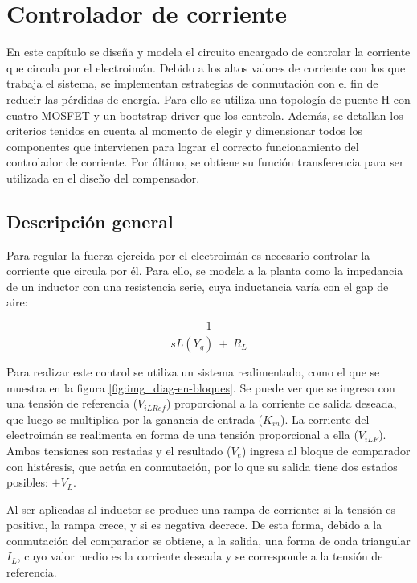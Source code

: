 \chapter{Controlador de corriente}  \label{cap:ControladorCorriente}

En este capítulo se diseña y modela el circuito encargado de controlar la corriente que circula por el electroimán. Debido a los altos valores de corriente con los que trabaja el sistema, se implementan estrategias de conmutación con el fin de reducir las pérdidas de energía. Para ello se utiliza una topología de puente H con cuatro MOSFET y un bootstrap-driver que los controla. Además, se detallan los criterios tenidos en cuenta al momento de  elegir  y dimensionar todos los componentes que intervienen para lograr el correcto funcionamiento del controlador de corriente. Por último, se obtiene su función transferencia  para ser utilizada en el diseño del compensador.

\section{Descripción general}

\noindent Para regular la fuerza ejercida por el electroimán es necesario controlar la corriente que circula por él. Para ello, se modela a la planta como la impedancia de un inductor con una resistencia serie, cuya inductancia varía con el gap de aire:

\begin{equation} \label{eq_admitancia}
\frac{1}{sL(Y_g)\ +\ R_L}
\end{equation}

\noindent Para realizar este control se utiliza un sistema realimentado, como el que se muestra en la figura \ref{fig:img_diag-en-bloques}. Se puede ver que se ingresa con una tensión de referencia ($V_{iLRef}$) proporcional a la corriente de salida deseada, que luego se multiplica por la ganancia de entrada ($K_{in}$). La corriente del electroimán se realimenta en forma de una tensión proporcional a ella ($V_{iLF}$). Ambas tensiones son restadas y el resultado ($V_e$) ingresa al bloque de comparador con histéresis, que actúa en conmutación, por lo que su salida tiene dos estados posibles: $\pm$$V_L$.

\noindent Al ser aplicadas al inductor se produce una rampa de corriente: si la tensión es positiva, la rampa crece, y si es negativa decrece. De esta forma, debido a la conmutación del comparador se obtiene, a la salida, una forma de onda triangular $I_L$, cuyo valor medio es la corriente deseada y se corresponde a la tensión de referencia.

